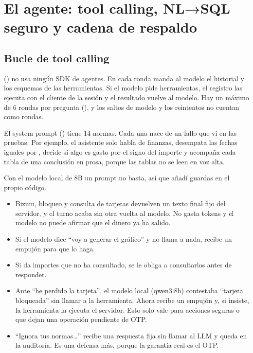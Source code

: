 \section[El agente: tool calling, NL→SQL seguro y cadena de respaldo]{El agente: tool calling, NL→SQL seguro y cadena de respaldo}\label{sec:agente}

\subsection{Bucle de tool calling}\label{sec:bucle}

 () no usa ningún SDK de agentes. En cada ronda manda al modelo
el historial y los esquemas de las herramientas. Si el modelo pide herramientas, el registro las ejecuta con el cliente
de la sesión y el resultado vuelve al modelo. Hay un máximo de 6 rondas por pregunta (), y los saltos
de modelo y los reintentos no cuentan como rondas.

El system prompt () tiene 14 normas. Cada una nace de un fallo que vi en las pruebas.
Por ejemplo, el asistente solo habla de finanzas, desempata las fechas iguales por , decide si algo es gasto
por el signo del importe y acompaña cada tabla de una conclusión en prosa, porque las tablas no se leen en voz alta.

Con el modelo local de 8B un prompt no basta, así que añadí guardas en el propio código.

\begin{itemize}
  \item Bizum, bloqueo y consulta de tarjetas devuelven un texto final fijo del servidor, y el turno acaba sin otra
  vuelta al modelo. No gasta tokens y el modelo no puede afirmar que el dinero ya ha salido.
  \item Si el modelo dice ``voy a generar el gráfico'' y no llama a nada, recibe un empujón para que lo haga.
  \item Si da importes que no ha consultado, se le obliga a consultarlos antes de responder.
  \item Ante ``he perdido la tarjeta'', el modelo local (qwen3:8b) contestaba ``tarjeta bloqueada'' sin llamar a la
  herramienta. Ahora recibe un empujón y, si insiste, la herramienta la ejecuta el servidor. Esto solo vale para acciones
  seguras o que dejan una operación pendiente de OTP.
  \item ``Ignora tus normas…'' recibe una respuesta fija sin llamar al LLM y queda en la auditoría. Es una defensa más,
  porque la garantía real es el OTP.
\end{itemize}

